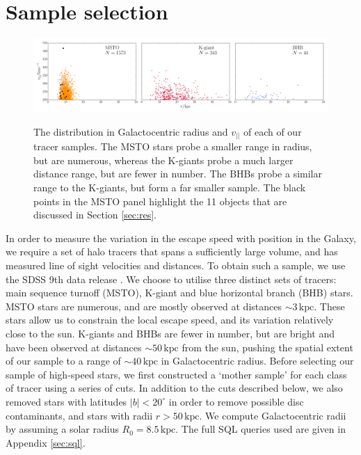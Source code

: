 \documentclass[useAMS,twocolumn,usenatbib]{mn2e}
\def\kpc{{\,\mathrm{kpc}}}
\def\vlos{{v_{||}}}
\begin{document}
\section{Sample selection}

\label{sec:samples}

\begin{figure}
\includegraphics[width=2\columnwidth]{plots/tracer_distributions}\\
\caption{The distribution in Galactocentric radius and $\vlos$ of each of our tracer samples. 
The MSTO stars probe a smaller range in radius, but are numerous, whereas the K-giants probe a much larger distance range, but are fewer in number.
The BHBs probe a similar range to the K-giants, but form a far smaller sample.
The black points in the MSTO panel highlight the 11 objects that are discussed in Section \ref{sec:res}.}
\label{fig:data}
\end{figure}

In order to measure the variation in the escape speed with position in the Galaxy, we require a set of halo tracers that spans a sufficiently large volume, and has measured line of sight velocities and distances. 
To obtain such a sample, we use the SDSS 9th data release \citep{Ah12}. 
We choose to utilise three distinct sets of tracers: main sequence turnoff (MSTO), K-giant and blue horizontal branch (BHB) stars. 
MSTO stars are numerous, and are mostly observed at distances $\sim 3\kpc$. 
These stars allow us to constrain the local escape speed, and its variation relatively close to the sun. 
K-giants and BHBs are fewer in number, but are bright and have been observed at distances $\sim 50\kpc$ from the sun, pushing the spatial extent of our sample to a range of $\sim 40\kpc$ in Galactocentric radius. 
Before selecting our sample of high-speed stars, we first constructed a `mother sample' for each class of tracer using a series of cuts. 
In addition to the cuts described below, we also removed stars with latitudes $|b| < 20^\circ$ in order to remove possible disc contaminants, and stars with radii $r>50\kpc$. 
We compute Galactocentric radii by assuming a solar radius $R_0 = 8.5\kpc$. 
The full {\sc SQL} queries used are given in Appendix \ref{sec:sql}.
\end{document}
